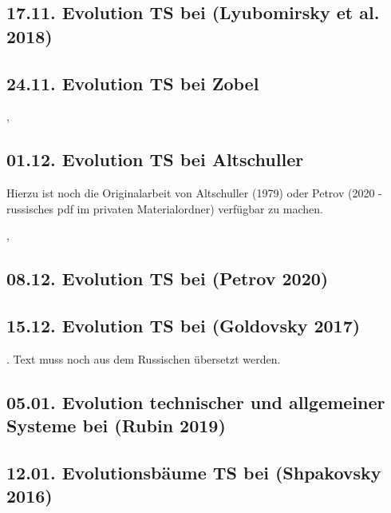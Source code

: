 \documentclass[11pt,a4paper]{article}
\begin{document}
\cite[Abschnitt 4.12.]{KoltzeSouchkov2017}

\subsection*{17.11. Evolution TS bei (Lyubomirsky et al. 2018)}

\cite{TESE2018}

\subsection*{24.11. Evolution TS bei Zobel}

\cite[Abschnitt 3.3.3]{Zobel2007}, \cite[Abschnitt 3.4]{Zobel2020}

\subsection*{01.12. Evolution TS bei Altschuller}

Hierzu ist noch die Originalarbeit von Altschuller (1979) oder Petrov (2020 -
russisches pdf im privaten Materialordner) verfügbar zu machen.

\cite{Altschuller1979}, \cite{Petrov2020a}

\subsection*{08.12. Evolution TS bei (Petrov 2020)} 

\cite{Petrov2020b}

\subsection*{15.12. Evolution TS bei (Goldovsky 2017)} 

\cite{Goldovsky2017}. Text muss noch aus dem Russischen übersetzt werden. 

\subsection*{05.01. Evolution technischer und allgemeiner Systeme bei (Rubin
  2019)}  

\cite{Rubin2019}

\subsection*{12.01. Evolutionsbäume TS bei (Shpakovsky 2016)}

\cite{Shpakovsky2016}
\end{document}
